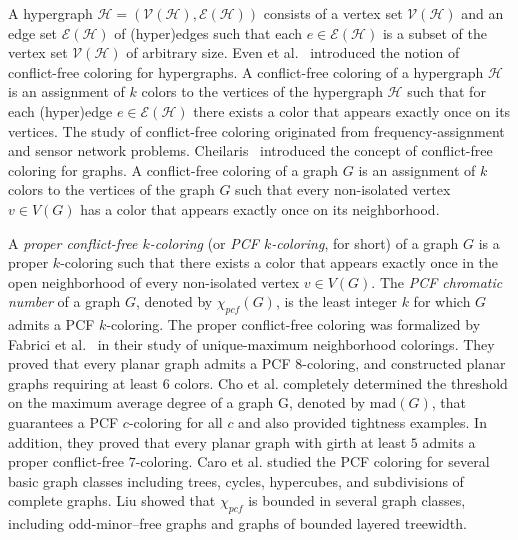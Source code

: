 \documentclass[11pt]{article}
\theoremstyle{plain}
\begin{document}
	\medskip
	
	A hypergraph $\mathcal{H}=(\mathcal {V(H), E(H)})$ consists of a vertex set $\mathcal{V(H)}$ and an edge set $\mathcal{E(H)}$ of (hyper)edges such that each $e\in \mathcal{E(H)}$ is a subset of the vertex set $\mathcal{V(H)}$ of arbitrary size. 
	Even et al.~\cite{ELRS} introduced the notion of conflict-free coloring for hypergraphs. A conflict-free coloring of a hypergraph $\mathcal{H}$ is an assignment of $k$ colors to the vertices of the hypergraph $\mathcal{H}$ such that for each (hyper)edge $e \in \mathcal{E(H)}$ there exists a color that appears exactly once on its vertices. The study of conflict-free coloring originated from frequency-assignment and sensor network problems. Cheilaris~\cite{C} introduced the concept of conflict-free coloring for graphs. A conflict-free coloring of a graph $G$ is an assignment of $k$ colors to the vertices of the graph $G$ such that every non-isolated vertex $v\in V(G)$ has a color that appears exactly once on its neighborhood. 
	
	
	
	
	\medskip
	
	A \emph{proper conflict-free $k$-coloring} (or \emph{PCF $k$-coloring}, for short) of a graph $G$ is a proper $k$-coloring such that there exists a color that appears exactly once in the open neighborhood of every non-isolated vertex $v\in V(G)$.
	The \emph{PCF chromatic number} of a graph $G$, denoted by $\chi_{pcf}(G)$, is the least integer $k$ for which $G$ admits a PCF $k$-coloring.
	The proper conflict-free coloring was formalized by Fabrici et al.~\cite{FLRS} in their study of unique-maximum neighborhood colorings. They proved that every planar graph admits a PCF $8$-coloring, and constructed planar graphs requiring at least $6$ colors. Cho et al. \cite{CCKP} completely determined the threshold on the maximum average degree of a graph G, denoted by $\text{mad}(G)$, that guarantees a PCF $c$-coloring
	for all $c$ and also provided tightness examples. In addition, they proved that every planar graph with girth at least $5$ admits a proper conflict-free $7$-coloring. Caro et al. \cite{CPS} studied the PCF coloring for several basic graph classes including trees, cycles, hypercubes, and subdivisions of complete graphs. Liu \cite{Liu} showed that $\chi_{pcf}$ is bounded in several graph classes, including odd-minor–free graphs and graphs of bounded layered treewidth.
	
\end{document}
